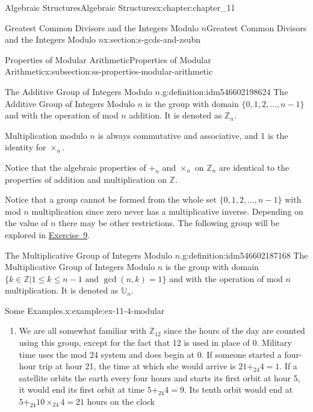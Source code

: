 \documentclass[oneside,10pt,]{book}
\numberwithin{equation}{section}
\begin{document}
\begin{chapterptx}{Algebraic Structures}{}{Algebraic Structures}{}{}{x:chapter:chapter_11}
\begin{sectionptx}{Greatest Common Divisors  and the Integers Modulo \(n\)}{}{Greatest Common Divisors  and the Integers Modulo \(n\)}{}{}{x:section:s-gcds-and-zsubn}
\begin{subsectionptx}{Properties of Modular Arithmetic}{}{Properties of Modular Arithmetic}{}{}{x:subsection:ss-properties-modular-arithmetic}
\begin{definition}{The Additive Group of Integers Modulo \(n\).}{g:definition:idm546602198624}%
%
\label{g:notation:idm546602195008}%
The Additive Group of Integers Modulo \(n\) is the group with domain \(\{0, 1, 2, \dots, n-1\}\) and with the operation of mod \(n\) addition. It is  denoted as \(\mathbb{Z}_n\).%
\end{definition}
Multiplication modulo \(n\) is always commutative and associative, and 1 is the identity for \(\times_n\).%
\par
Notice that the algebraic properties of \(+_n\) and \(\times_n\) on \(\mathbb{Z}_n\) are identical to the properties of addition and multiplication on \(\mathbb{Z}\).%
\par
Notice that a group cannot be formed from the whole set \(\{0, 1, 2, \dots, n-1\}\) with mod \(n\) multiplication since zero never has a multiplicative inverse.  Depending on the value of \(n\) there may be other restrictions. The following group will be explored in \hyperlink{x:exercise:exercise_u_n}{Exercise~9}.%
\begin{definition}{The Multiplicative Group of Integers Modulo \(n\).}{g:definition:idm546602187168}%
%
\label{g:notation:idm546602186016}%
The Multiplicative Group of Integers Modulo \(n\) is the group with domain \(\{k\in \mathbb{Z} \vert  1 \leq k \leq n-1 \textrm{ and }\gcd(n,k)=1\}\) and with the operation of mod \(n\) multiplication.  It is  denoted as \(\mathbb{U}_n\).%
\end{definition}
\begin{example}{Some Examples.}{x:example:ex-11-4-modular}%
%
\begin{enumerate}[label=(\alph*)]
\item{}We are all somewhat familiar with \(\mathbb{Z}_{12}\) since the hours of the day are counted using this group, except for the fact that 12 is used in place of 0.  Military time uses the mod 24 system and does begin at 0.  If someone started a four-hour trip at hour 21, the time at which she would arrive is \(21 +_{24} 4 = 1\). If a satellite orbits the earth every four hours and starts its first orbit at hour 5, it would end its first orbit at time  \(5 +_{24}4 =9\). Its tenth orbit would end at \(5 +_{24} 10\times_{24}4 =21\) hours on the clock%

\end{enumerate}
\end{example}
\end{subsectionptx}
\end{sectionptx}
\end{chapterptx}
\end{document}
